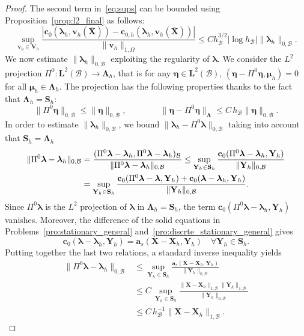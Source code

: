 \documentclass[oneside]{amsart} %
\newcommand\LdBd{\mathbf{L}^2(\B)} %
\newcommand\B{\mathcal B} %
\renewcommand\a{\mathbf{a}} %
\renewcommand\v{\mathbf{v}} %
\renewcommand\c{\mathbf{c}} %
\renewcommand\S{\mathbf{S}} %
\newcommand\X{\mathbf{X}} %
\newcommand\Xbar{\overline{\X}} %
\newcommand\Y{\mathbf{Y}} %
\newcommand\LL{{\boldsymbol{\Lambda}}} %
\newcommand\Vline{\mathbf{V}} %
\newcommand\Sline{\S} %
\newcommand\llambda{\boldsymbol\lambda} %
\newcommand\mmu{{\boldsymbol\mu}} %
\newcommand\llambdaI{\Pi^0\llambda}
\begin{document}
\begin{proof}
		The second term in~\eqref{eq:sups} can be bounded using Proposition~\ref{prop:l2_final} as
		follows:
		\[
		\sup_{\v_h\in\Vline_h}
		\frac{|\c_0(\llambda_h,\v_h(\Xbar))-\c_{0,h}(\llambda_h,\v_h(\Xbar))|}
		{\|\v_h\|_{1,\Omega}} \le
		C h_\B^{3/2}|\log h_\B| \|\llambda_h\|_{0,\B}.
		\]
		We now estimate $\|\llambda_h\|_{0,\B}$ exploiting the regularity of
		$\llambda$. We consider the $L^2$ projection $\Pi^0:\LdBd\rightarrow\LL_h$, that is for any ${\boldsymbol{\eta}\in\LdBd}$, $(\boldsymbol{\eta}-\Pi^0\boldsymbol{\eta},\mmu_h)=0$ for all $\mmu_h\in\LL_h$. The projection has the following properties thanks to the fact that $\LL_h=\Sline_h$:
		\begin{equation}\label{eq:proj_prop}
			\|\Pi^0\boldsymbol{\eta}\|_{0,\B}\le\|\boldsymbol{\eta}\|_{0,\B},
			\qquad\qquad
			\|\boldsymbol{\eta}-\Pi^0\boldsymbol{\eta}\|_\LL \le C\,h_\B\|\boldsymbol{\eta}\|_{0,\B}.
		\end{equation}
		In order to estimate $\|\llambda_h\|_{0,\B}$, we bound
		$\|\llambda_h-\llambdaI\|_{0,\B}$ taking into account that $\S_h=\LL_h$
		\begin{equation}
			\aligned
			\|\llambdaI-\llambda_h\|_{0,\B}&
			= \frac{(\llambdaI-\llambda_h,\llambdaI-\llambda_h)_\B}{\|\llambdaI-\llambda_h\|_{0,\B}}
			\le
			\sup_{\Y_h\in\S_h}\frac{\c_0(\llambdaI-\llambda_h,\Y_h)}{\|\Y_h\|_{0,\B}}\\
			&
			=\sup_{\Y_h\in\S_h}\frac{\c_0(\llambdaI-\llambda,\Y_h)+\c_0(\llambda-\llambda_h,\Y_h)}
			{\|\Y_h\|_{0,\B}}.
			\endaligned
		\end{equation}
		Since $\llambdaI$ is the $L^2$ projection of $\llambda$ in $\LL_h=\S_h$, the
		term $\c_0(\llambdaI-\llambda_h,\Y_h)$ vanishes. 
		Moreover, the difference of the solid equations in
		Problems~\ref{pro:stationary_general} and~\ref{pro:discrte_stationary_general}
		gives
		\[
		\c_0(\llambda-\llambda_h,\Y_h)=\a_s(\X-\X_h,\Y_h)
		\quad\forall\Y_h\in\Sline_h.
		\]
		Putting together the last two relations, a standard inverse inequality yields
		\begin{equation}
			\begin{aligned}
				\|\llambdaI-\llambda_h\|_{0,\B}
				&\le \sup_{\Y_h\in\S_h}\frac{\a_s(\X-\X_h,\Y_h)}{\|\Y_h\|_{0,\B}}\\
				&\le C\,\sup_{\Y_h\in\S_h} \frac{\|\X-\X_h\|_{1,\B}\|\Y_h\|_{1,\B}}{\|\Y_h\|_{0,\B}}\\
				&\le C\, h_\B^{-1}\|\X-\X_h\|_{1,\B}.
			\end{aligned}
		\end{equation}

\end{proof}
\end{document}
